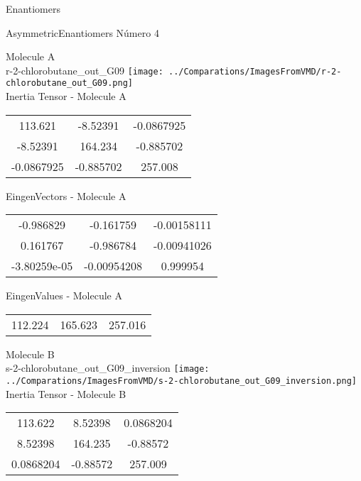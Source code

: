 \begin{center}
\vtab
\vtab
\textcolor{NavyBlue}{\Large Enantiomers}
\end{center}

 \newpage

\vtab[-2cm]
\begin{center}
{\large AsymmetricEnantiomers \tab Número 4}
\end{center}
\begin{multicols}{2}
\begin{center}

Molecule A \\ 
r-2-chlorobutane\_out\_G09
\texttt{[image: ../Comparations/ImagesFromVMD/r-2-chlorobutane\_out\_G09.png]}
\\
Inertia Tensor - Molecule A \\
\vtab

\begin{tabular}{|c c c|}
113.621	 & 	-8.52391	 & 	-0.0867925	 \\
-8.52391	 & 	164.234	 & 	-0.885702	 \\
-0.0867925	 & 	-0.885702	 & 	257.008
\end{tabular}

\vtab
 EingenVectors - Molecule A     \\
\vtab
\begin{tabular}{|c c c|}
-0.986829	 & 	-0.161759	 & 	-0.00158111	 \\
0.161767	 & 	-0.986784	 & 	-0.00941026	 \\
-3.80259e-05	 & 	-0.00954208	 & 	0.999954
\end{tabular}

\vtab
 EingenValues - Molecule A     \\
\vtab
\begin{tabular}{|c c c|}
112.224	 & 	165.623	 & 	257.016	 \\
\end{tabular}
\columnbreak

Molecule B \\ 
s-2-chlorobutane\_out\_G09\_inversion
\texttt{[image: ../Comparations/ImagesFromVMD/s-2-chlorobutane\_out\_G09\_inversion.png]}
\\
Inertia Tensor - Molecule B \\
\vtab

\begin{tabular}{|c c c|}
113.622	 & 	8.52398	 & 	0.0868204	 \\
8.52398	 & 	164.235	 & 	-0.88572	 \\
0.0868204	 & 	-0.88572	 & 	257.009
\end{tabular}


\end{center}
\end{multicols}
